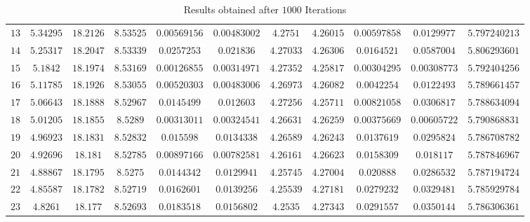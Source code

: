 \documentclass[12pt]{report}
\numberwithin{definition}{section}
\begin{document}
\begin{landscape}
\begin{table}[ht]
\begin{tabular}{ c  c  c  c  c  c  c  c  c  c  c}
    $13$ & $5.34295$ & $18.2126$ & $8.53525$ & $0.00569156$ & $0.00483002$ &  $4.2751$ & $4.26015$ & $0.00597858$ &  $0.0129977$ & $5.797240213$ \\
    $14$ & $5.25317$ & $18.2047$ & $8.53339$ &  $0.0257253$ &   $0.021836$ & $4.27033$ & $4.26306$ &  $0.0164521$ &  $0.0587004$ & $5.806293601$ \\
    $15$ &  $5.1842$ & $18.1974$ & $8.53169$ & $0.00126855$ & $0.00314971$ & $4.27352$ & $4.25817$ & $0.00304295$ & $0.00308773$ & $5.792404256$ \\
    $16$ & $5.11785$ & $18.1926$ & $8.53055$ & $0.00520303$ & $0.00483006$ & $4.26973$ & $4.26082$ &  $0.0042254$ &  $0.0122493$ & $5.789661457$ \\
    $17$ & $5.06643$ & $18.1888$ & $8.52967$ &  $0.0145499$ &   $0.012603$ & $4.27256$ & $4.25711$ & $0.00821058$ &  $0.0306817$ & $5.788634094$ \\
    $18$ & $5.01205$ & $18.1855$ &  $8.5289$ & $0.00313011$ & $0.00324541$ & $4.26631$ & $4.26259$ & $0.00375669$ & $0.00605722$ & $5.790868831$ \\
    $19$ & $4.96923$ & $18.1831$ & $8.52832$ &   $0.015598$ &  $0.0134338$ & $4.26589$ & $4.26243$ &  $0.0137619$ &  $0.0295824$ & $5.786708782$ \\
    $20$ & $4.92696$ &  $18.181$ & $8.52785$ & $0.00897166$ & $0.00782581$ & $4.26161$ & $4.26623$ &  $0.0158309$ &   $0.018117$ & $5.787846967$ \\
    $21$ & $4.88867$ & $18.1795$ &  $8.5275$ &  $0.0144342$ &  $0.0129941$ & $4.25745$ & $4.27004$ &   $0.020888$ &  $0.0286532$ & $5.787194724$ \\
    $22$ & $4.85587$ & $18.1782$ & $8.52719$ &  $0.0162601$ &  $0.0139256$ & $4.25539$ & $4.27181$ &  $0.0279232$ &  $0.0329481$ & $5.785929784$ \\
    $23$ &  $4.8261$ &  $18.177$ & $8.52693$ &  $0.0183518$ &  $0.0156802$ &  $4.2535$ & $4.27343$ &  $0.0291557$ &  $0.0350144$ & $5.786306361$ \\[1ex]
    \bottomrule
  \end{tabular}
  \caption{Results obtained after $1000$ Iterations}
\end{table}
\end{landscape}


\break
 
\printbibliography
 
\end{document}
